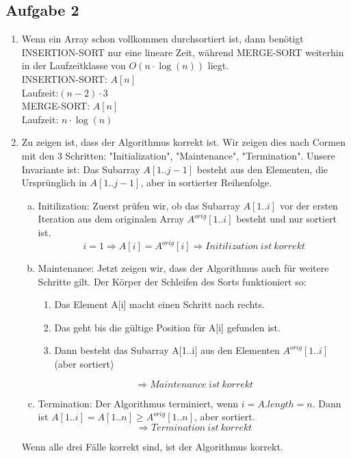 \documentclass[a4paper,fleqn]{scrartcl}
\begin{document}
\subsection*{Aufgabe 2}
\begin{enumerate}[1.]
\item
Wenn ein Array schon vollkommen durchsortiert ist, dann benötigt INSERTION-SORT nur eine lineare Zeit, während MERGE-SORT weiterhin in der Laufzeitklasse von $O\left(n \cdot \log(n)\right)$ liegt. \\
INSERTION-SORT: $A[n]$ \\
Laufzeit:$(n-2)\cdot 3$ \\
MERGE-SORT: $A[n]$ \\
Laufzeit: $n\cdot \log(n)$

\item Zu zeigen ist, dass der Algorithmus korrekt ist. Wir zeigen dies nach
Cormen mit den 3 Schritten: "Initialization", "Maintenance", "Termination".
Unsere Invariante ist: Das Subarray \(A[1..j-1]\) besteht aus den Elementen, die
Ursprünglich in \(A[1..j-1]\), aber in sortierter Reihenfolge.
\begin{enumerate}[(a)]
\item Initilization: Zuerst prüfen wir, ob das Subarray \(A[1..i]\) vor der
ersten Iteration aus dem originalen Array \(A^{orig}[1..i]\) besteht und
nur sortiert ist.
\[i = 1 \Rightarrow A[i] = A^{orig}[i] \Rightarrow Initilization\ ist\ korrekt\]
\item Maintenance: Jetzt zeigen wir, dass der Algorithmus auch für weitere Schritte gilt.
Der Körper der Schleifen des Sorts funktioniert so:
\begin{enumerate}
\item Das Element A[i] macht einen Schritt nach rechts.
\item Das geht bis die gültige Position für A[i] gefunden ist.
\item Dann besteht das Subarray A[1..i] aus den Elementen \(A^{orig}[1..i]\) (aber sortiert)
\end{enumerate}
\[\Rightarrow Maintenance\ ist\ korrekt\]
\item Termination: Der Algorithmus terminiert, wenn \(i=A.length = n\).
Dann ist \(A[1..i] = A[1..n] \geq A^{orig}[1..n]\), aber sortiert.
\[\Rightarrow Termination\ ist\ korrekt\]
\end{enumerate}
Wenn alle drei Fälle korrekt sind, ist der Algorithmus korrekt.
\end{enumerate}
\end{document}

